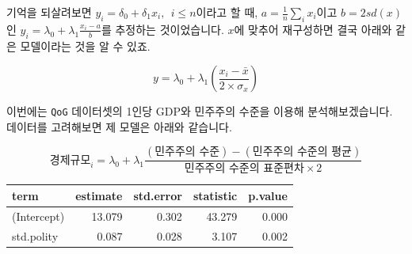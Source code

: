 \documentclass[
]{book}
\newenvironment{Shaded}{\begin{snugshade}}{\end{snugshade}}
\newcommand{\CommentTok}[1]{\textcolor[rgb]{0.56,0.35,0.01}{\textit{#1}}}
\newcommand{\DataTypeTok}[1]{\textcolor[rgb]{0.13,0.29,0.53}{#1}}
\newcommand{\DecValTok}[1]{\textcolor[rgb]{0.00,0.00,0.81}{#1}}
\newcommand{\KeywordTok}[1]{\textcolor[rgb]{0.13,0.29,0.53}{\textbf{#1}}}
\newcommand{\NormalTok}[1]{#1}
\newcommand{\OperatorTok}[1]{\textcolor[rgb]{0.81,0.36,0.00}{\textbf{#1}}}
\newcommand{\StringTok}[1]{\textcolor[rgb]{0.31,0.60,0.02}{#1}}
\begin{document}
기억을 되살려보면 \(y_i = \delta_0 + \delta_1x_i, \:\:i\leq n\)이라고 할 때, \(a = \frac{1}{n}\sum_i x_i\)이고 \(b=2sd(x)\)인 \(y_i = \lambda_0 + \lambda_1\frac{x_i-a}{b}\)를 추정하는 것이었습니다. \(x\)에 맞추어 재구성하면 결국 아래와 같은 모델이라는 것을 알 수 있죠.

\[
y = \lambda_0 + \lambda_1(\frac{x_i - \bar{x}}{2\times\sigma_x})
\]

이번에는 \texttt{QoG} 데이터셋의 1인당 GDP와 민주주의 수준을 이용해 분석해보겠습니다. 데이터를 고려해보면 제 모델은 아래와 같습니다.

\[
\text{경제규모}_i = \lambda_0 + \lambda_1\frac{(\text{민주주의 수준})-(\text{민주주의 수준의 평균})}{\text{민주주의 수준의 표준편차}\times2}
\]

\begin{Shaded}
\end{Shaded}

\begin{tabular}{l|r|r|r|r}
\hline
term & estimate & std.error & statistic & p.value\\
\hline
(Intercept) & 13.079 & 0.302 & 43.279 & 0.000\\
\hline
std.polity & 0.087 & 0.028 & 3.107 & 0.002\\
\hline
\end{tabular}

\begin{Shaded}
\end{Shaded}
\end{document}
